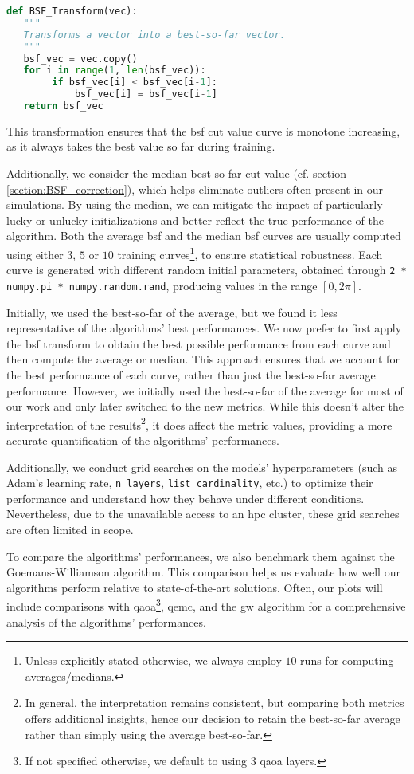\begin{lstlisting}[language=Python, style=My_Python, caption={Auxiliary function: best-so-far transformation}, label={lst:bsf_transform}]
def BSF_Transform(vec):
   """
   Transforms a vector into a best-so-far vector.
   """
   bsf_vec = vec.copy()
   for i in range(1, len(bsf_vec)):
        if bsf_vec[i] < bsf_vec[i-1]:
            bsf_vec[i] = bsf_vec[i-1]
   return bsf_vec
\end{lstlisting}
This transformation ensures that the \acrshort{bsf} cut value curve is monotone increasing, as it always takes the best value so far during training.

Additionally, we consider the median best-so-far cut value (cf. section \ref{section:BSF_correction}), which helps eliminate outliers often present in our simulations. By using the median, we can mitigate the impact of particularly lucky or unlucky initializations and better reflect the true performance of the algorithm. Both the average \acrshort{bsf} and the median \acrshort{bsf} curves are usually computed using either $3$, $5$ or $10$ training curves\footnote{Unless explicitly stated otherwise, we always employ $10$ runs for computing averages/medians.}, to ensure statistical robustness. Each curve is generated with different random initial parameters, obtained through \texttt{2 * numpy.pi * numpy.random.rand}, producing values in the range $[0,2\pi]$.

Initially, we used the best-so-far of the average, but we found it less representative of the algorithms' best performances. We now prefer to first apply the \acrshort{bsf} transform to obtain the best possible performance from each curve and then compute the average or median. This approach ensures that we account for the best performance of each curve, rather than just the best-so-far average performance. However, we initially used the best-so-far of the average for most of our work and only later switched to the new metrics. While this doesn't alter the interpretation of the results\footnote{In general, the interpretation remains consistent, but comparing both metrics offers additional insights, hence our decision to retain the best-so-far average rather than simply using the average best-so-far.}, it does affect the metric values, providing a more accurate quantification of the algorithms' performances.

Additionally, we conduct grid searches on the models' hyperparameters (such as Adam's learning rate, \texttt{n\_layers}, \texttt{list\_cardinality}, etc.) to optimize their performance and understand how they behave under different conditions. Nevertheless, due to the unavailable access to an \acrshort{hpc} cluster, these grid searches are often limited in scope.

To compare the algorithms' performances, we also benchmark them against the Goemans-Williamson algorithm. This comparison helps us evaluate how well our algorithms perform relative to state-of-the-art solutions. Often, our plots will include comparisons with \acrshort{qaoa}\footnote{If not specified otherwise, we default to using $3$ \acrshort{qaoa} layers.}, \acrshort{qemc}, and the \acrshort{gw} algorithm for a comprehensive analysis of the algorithms' performances.
